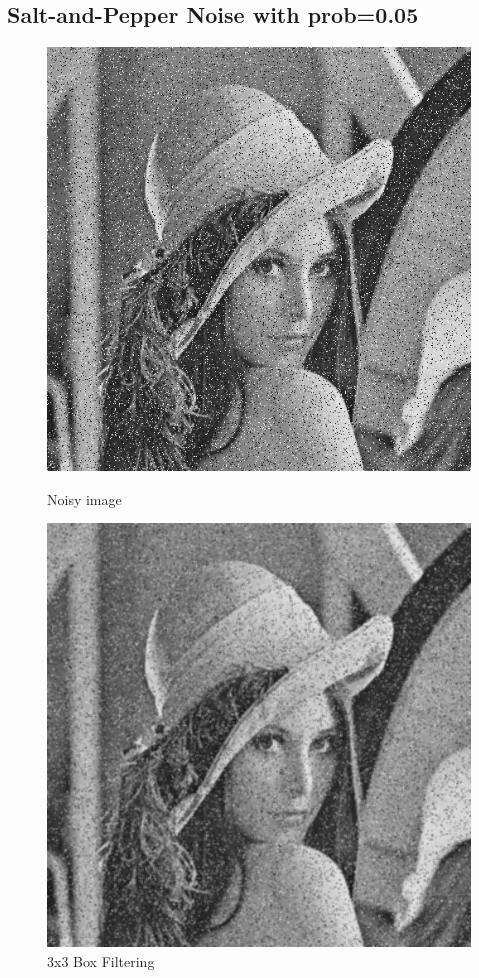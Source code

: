 \documentclass{article}
\begin{document}
\subsection{Salt-and-Pepper Noise with prob=0.05}
\begin{figure}[H]
  \includegraphics[width=\linewidth]{img/snp5.png}
  \caption{Noisy image}\label{fig:snp5}
\endminipage\hfill
{}
  \includegraphics[width=\linewidth]{img/snp5_box_3x3.png}
  \caption{3x3 Box Filtering}\label{fig:snp5_box_3x3}
\endminipage\hfill
\end{figure}
\end{document}
